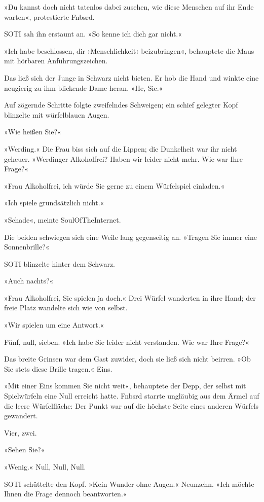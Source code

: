 »Du kannst doch nicht tatenlos dabei zusehen, wie diese Menschen auf ihr Ende warten«, protestierte Fnbsrd.

SOTI sah ihn erstaunt an. »So kenne ich dich gar nicht.«

»Ich habe beschlossen, dir ›Menschlichkeit‹ beizubringen«, behauptete die Maus mit hörbaren Anführungszeichen.

Das ließ sich der Junge in Schwarz nicht bieten. Er hob die Hand und winkte eine neugierig zu ihm blickende Dame heran. »He, Sie.«

Auf zögernde Schritte folgte zweifelndes Schweigen; ein schief gelegter Kopf blinzelte mit würfelblauen Augen.

»Wie heißen Sie?«

»Werding.« Die Frau biss sich auf die Lippen; die Dunkelheit war ihr nicht geheuer. »Werdinger Alkoholfrei? Haben wir leider nicht mehr. Wie war Ihre Frage?«

»Frau Alkoholfrei, ich würde Sie gerne zu einem Würfelspiel einladen.«

»Ich spiele grundsätzlich nicht.«

»Schade«, meinte SoulOfTheInternet.

Die beiden schwiegen sich eine Weile lang gegenseitig an. »Tragen Sie immer eine Sonnenbrille?«

SOTI blinzelte hinter dem Schwarz.

»Auch nachts?«

»Frau Alkoholfrei, Sie spielen ja doch.« Drei Würfel wanderten in ihre Hand; der freie Platz wandelte sich wie von selbst.

»Wir spielen um eine Antwort.«

Fünf, null, sieben. »Ich habe Sie leider nicht verstanden. Wie war Ihre Frage?«

Das breite Grinsen war dem Gast zuwider, doch sie ließ sich nicht beirren. »Ob Sie stets diese Brille tragen.« Eins.

»Mit einer Eins kommen Sie nicht weit«, behauptete der Depp, der selbst mit Spielwürfeln eine Null erreicht hatte. Fnbsrd starrte ungläubig aus dem Ärmel auf die leere Würfelfläche: Der Punkt war auf die höchste Seite eines anderen Würfels gewandert.

Vier, zwei.

»Sehen Sie?«

»Wenig.« Null, Null, Null.

SOTI schüttelte den Kopf. »Kein Wunder ohne Augen.« Neunzehn. »Ich möchte Ihnen die Frage dennoch beantworten.«

